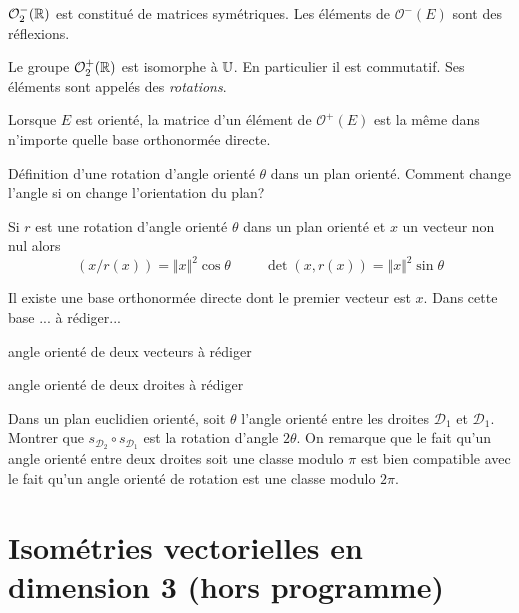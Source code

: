 \begin{rem}
 $\mathcal O_2^-(\mathbb{R})$ est constitué de matrices symétriques. Les éléments de $\mathcal O^-(E)$ sont des réflexions.
\end{rem}

Le groupe $\mathcal O_2^+(\mathbb{R})$ est isomorphe à $\mathbb{U}$. En particulier il est commutatif. Ses éléments sont appelés des \emph{rotations}.

Lorsque $E$ est orienté, la matrice d'un élément de $\mathcal O^+(E)$ est la même dans n'importe quelle base orthonormée directe.

Définition d'une rotation d'angle orienté $\theta$ dans un plan orienté. Comment change l'angle si on change l'orientation du plan?
\begin{prop}
 Si $r$ est une rotation d'angle orienté $\theta$ dans un plan orienté et $x$ un vecteur non nul alors 
\begin{displaymath}
(x/r(x)) = \Vert x \Vert^2 \cos \theta \hspace{1cm} \det(x,r(x))= \Vert x\Vert^2 \sin \theta
\end{displaymath}
\end{prop}
\begin{demo}
Il existe une base orthonormée directe dont le premier vecteur est $x$. Dans cette base ...  à rédiger... 
\end{demo}

 
\begin{defi}
 angle orienté de deux vecteurs à rédiger
\end{defi}
\begin{defi}
 angle orienté de deux droites à rédiger
\end{defi}
Dans un plan euclidien orienté, soit $\theta$ l'angle orienté entre les droites $\mathcal{D}_1$ et $\mathcal{D}_1$. Montrer que $s_{\mathcal{D}_2}\circ s_{\mathcal{D}_1}$ est la rotation d'angle $2\theta$. On remarque que le fait qu'un angle orienté entre deux droites soit une classe modulo $\pi$ est bien compatible avec le fait qu'un angle orienté de rotation est une classe modulo $2\pi$.

\section{Isométries vectorielles en dimension 3 (hors programme)}
